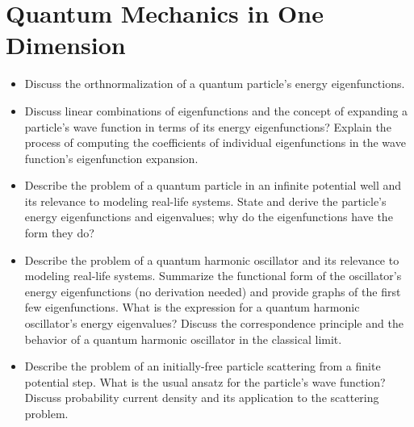 \section{Quantum Mechanics in One Dimension}
\begin{itemize}

    \item Discuss the orthnormalization of a quantum particle's energy eigenfunctions.

    \item Discuss linear combinations of eigenfunctions and the concept of expanding a particle's wave function in terms of its energy eigenfunctions?
    Explain the process of computing the coefficients of individual eigenfunctions in the wave function's eigenfunction expansion.

    \item Describe the problem of a quantum particle in an infinite potential well and its relevance to modeling real-life systems.
    State and derive the particle's energy eigenfunctions and eigenvalues;
    why do the eigenfunctions have the form they do?

    \item Describe the problem of a quantum harmonic oscillator and its relevance to modeling real-life systems.
    Summarize the functional form of the oscillator's energy eigenfunctions (no derivation needed) and provide graphs of the first few eigenfunctions.
    What is the expression for a quantum harmonic oscillator's energy eigenvalues? 
    Discuss the correspondence principle and the behavior of a quantum harmonic oscillator in the classical limit.

    \item Describe the problem of an initially-free particle scattering from a finite potential step.
    What is the usual ansatz for the particle's wave function?
    Discuss probability current density and its application to the scattering problem.

\end{itemize}

